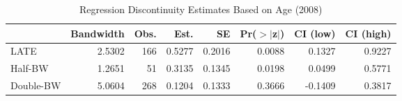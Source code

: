 \begin{table}[ht]
\centering
\begin{tabular}{lrrrrrrr}
  \hline
 & Bandwidth & Obs. & Est. & SE & Pr($>$$|$z$|$) & CI (low) & CI (high) \\ 
  \hline
LATE & 2.5302 & 166 & 0.5277 & 0.2016 & 0.0088 & 0.1327 & 0.9227 \\ 
  Half-BW & 1.2651 & 51 & 0.3135 & 0.1345 & 0.0198 & 0.0499 & 0.5771 \\ 
  Double-BW & 5.0604 & 268 & 0.1204 & 0.1333 & 0.3666 & -0.1409 & 0.3817 \\ 
   \hline
\end{tabular}
\caption{Regression Discontinuity Estimates Based on Age (2008)} 
\label{tab:rd2008y}
\end{table}
